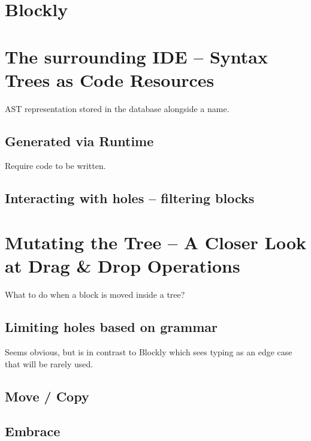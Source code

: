 \documentclass[]{report}
\begin{document}
\section{Blockly}

\section{The surrounding IDE -- Syntax Trees as Code Resources}

AST representation stored in the database alongside a name.

\newpage

\subsection{Generated via Runtime}
\label{sec:generated-via-runtime}

Require code to be written.

\subsection{Interacting with holes -- filtering blocks}
\label{sec:interacting-holes-filter}

\section{Mutating the Tree -- A Closer Look at Drag \& Drop Operations}
\label{sec:mutating-the-tree-drag-drop-operations}

What to do when a block is moved inside a tree?

\subsection{Limiting holes based on grammar}
\label{sec:limiting-holes-based-on-grammar}

Seems obvious, but is in contrast to Blockly which sees typing as an edge case that will be rarely used.

\subsection{Move / Copy}\label{sec:move-copy}

\subsection{Embrace}
\label{sec:embrace}
\end{document}
